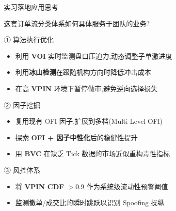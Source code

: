 \documentclass[10pt,aspectratio=169]{beamer}
\begin{document}
\begin{frame}{实习落地应用思考}

  这套订单流分类体系如何具体服务于团队的业务?

  \vfill

  \begin{block}{① 算法执行优化}
    \begin{itemize}
      \item 利用 \textbf{VOI} 实时监测盘口压迫力,动态调整子单激进度
      \item 利用\textbf{冰山检测}在跟随机构方向时降低冲击成本
      \item 在高 \textbf{VPIN} 环境下暂停做市,避免逆向选择损失
    \end{itemize}
  \end{block}

  \begin{block}{② 因子挖掘}
    \begin{itemize}
      \item 复用现有 OFI 因子,扩展到多档(Multi-Level OFI)
      \item 探索 \textbf{OFI + 因子中性化}后的稳健性提升
      \item 用 \textbf{BVC} 在缺乏 Tick 数据的市场近似重构毒性指标
    \end{itemize}
  \end{block}

  \begin{block}{③ 风控体系}
    \begin{itemize}
      \item 将 \textbf{VPIN CDF $> 0.9$} 作为系统级流动性预警阈值
      \item 监测撤单/成交比的瞬时跳跃以识别 Spoofing 操纵
    \end{itemize}
  \end{block}

\end{frame}
\end{document}
